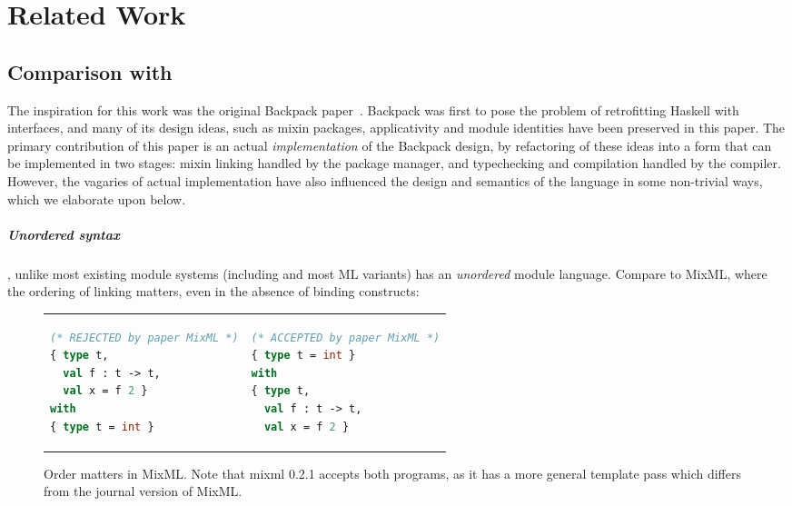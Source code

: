 \chapter{Related Work}


\section{Comparison with \OldBackpack{}}

The inspiration for this
work was the original Backpack paper~\cite{backpack}.  Backpack was
first to pose the problem of retrofitting Haskell with interfaces, and
many of its design ideas, such as mixin packages, applicativity and
module identities have been preserved in this paper.  The primary contribution
of this paper is an actual \emph{implementation} of the
Backpack design, by refactoring of these ideas into a form that can be
implemented in two stages: mixin linking handled by the package manager,
and typechecking and compilation handled by the compiler.  However,
the vagaries of actual implementation have also influenced the design
and semantics of the language in some non-trivial ways, which we elaborate
upon below.

\paragraph{Unordered syntax}

\Backpack{}, unlike most existing module systems (including \OldBackpack{}
and most ML variants) has an \emph{unordered} module language.  Compare
to MixML, where the ordering of linking matters, even in the absence
of binding constructs:

\begin{figure}[H]
\begin{tabular}{p{} p{}}
\begin{lstlisting}[language=ML,escapechar=@]
(* REJECTED by paper MixML *)
{ type t,
  val f : t -> t,
  val x = f 2 }
with
{ type t = int }
\end{lstlisting}
&
\begin{lstlisting}[language=ML]
(* ACCEPTED by paper MixML *)
{ type t = int }
with
{ type t,
  val f : t -> t,
  val x = f 2 }
\end{lstlisting}
\end{tabular}
\caption{Order matters in MixML.  Note that mixml 0.2.1 accepts both programs, as it has a more general template pass which differs from the journal version of MixML.}
\label{fig:order-matters-in-mixml}
\end{figure}

